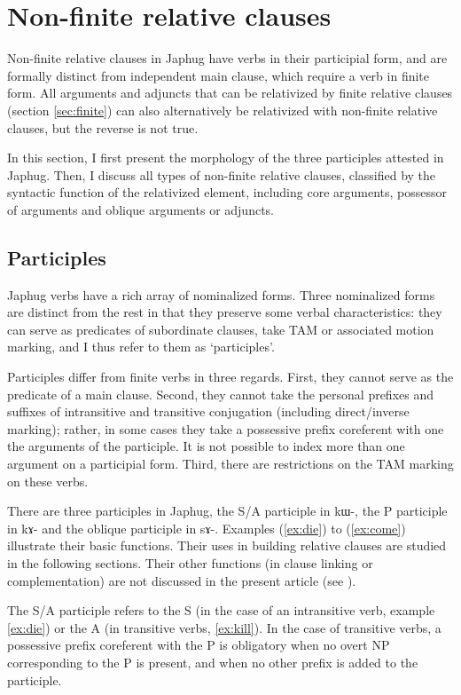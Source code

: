 \documentclass[oldfontcommands,oneside,a4paper,11pt]{article}
\newcommand{\ipa}[1]{{\phon #1}} %
\newcommand{\refb}[1]{(\ref{#1})}
\begin{document}
\section{Non-finite relative clauses} \label{sec:nonfinite}
Non-finite relative clauses in Japhug have verbs in their participial form, and are formally distinct from independent main clause, which require a verb in finite form. All arguments and adjuncts that can be relativized by finite relative clauses (section \ref{sec:finite}) can also alternatively be relativized with non-finite relative clauses, but the reverse is not true.

In this section, I first present the morphology of the three participles attested in Japhug. Then, I discuss all types of non-finite relative clauses, classified by the syntactic function of the relativized element, including core arguments, possessor of arguments and oblique arguments or adjuncts.



\subsection{Participles}
Japhug verbs have a rich array of nominalized forms. Three nominalized forms are distinct from the rest in that they preserve some verbal characteristics: they can serve as predicates of subordinate clauses, take TAM or associated motion marking, and I thus refer to them as `participles'. 

Participles differ from finite verbs in three regards. First, they cannot serve as the predicate of a main clause. Second, they cannot take the personal prefixes and suffixes of intransitive and transitive conjugation (including direct/inverse marking); rather, in some cases they take a possessive prefix coreferent with one the arguments of the participle. It is not possible to index more than one argument on a participial form. Third, there are restrictions on the TAM marking on these verbs.

There are three participles in Japhug, the S/A participle in \ipa{kɯ-}, the P participle in \ipa{kɤ-} and the oblique participle in \ipa{sɤ-}. Examples \refb{ex:die} to \refb{ex:come} illustrate their basic functions. Their uses in building relative clauses are studied in the following sections. Their other functions (in clause linking or complementation) are not discussed in the present article (see \citealt{jacques14linking}).

The S/A participle refers to the S (in the case of an intransitive verb, example \ref{ex:die}) or the A (in transitive verbs, \ref{ex:kill}). In the case of transitive verbs, a possessive prefix coreferent with the P is obligatory when no overt NP corresponding to the P is present, and when no other prefix is added to the participle.
\end{document}
